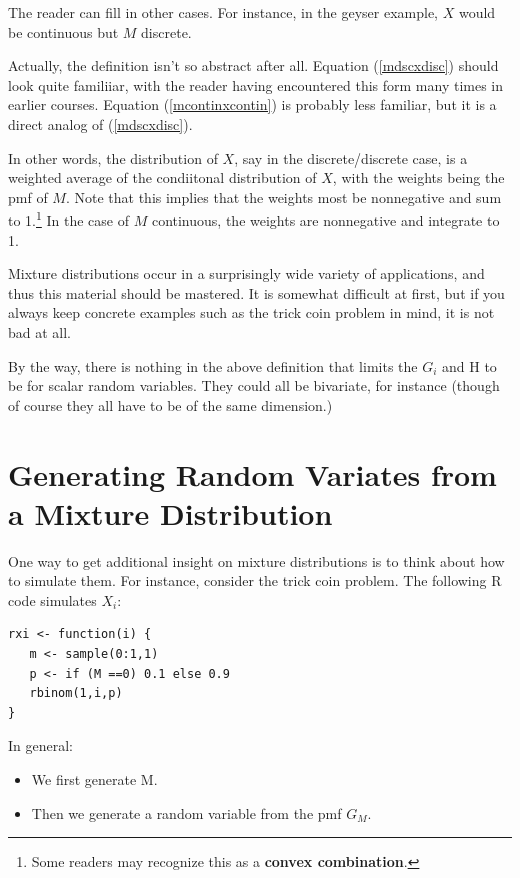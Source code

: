 The reader can fill in other cases.  For instance, in the geyser
example, $X$ would be continuous but $M$ discrete.

Actually, the definition isn't so abstract after all.  Equation
(\ref{mdscxdisc}) should look quite familiiar, with the reader having
encountered this form many times in earlier courses.  Equation
(\ref{mcontinxcontin}) is probably less familiar, but it is a direct
analog of (\ref{mdscxdisc}).

In other words, the distribution of $X$, say in the discrete/discrete case,
is a weighted average of the condiitonal distribution of $X$, with the
weights being the pmf of $M$.  Note that this implies that the weights
most be nonnegative and sum to 1.\footnote{Some readers may recognize
this as a {\bf convex combination}.}  In the case of $M$ continuous, the
weights are nonnegative and integrate to 1.

Mixture distributions occur in a surprisingly wide variety of
applications, and thus this material should be mastered.  It is somewhat
difficult at first, but if you always keep concrete examples such as the
trick coin problem in mind, it is not bad at all.

By the way, there is nothing in the above definition that limits the
$G_i$ and H to be for scalar random variables.  They could all be
bivariate, for instance (though of course they all have to be of the
same dimension.)

\section{Generating Random Variates from a Mixture Distribution}

One way to get additional insight on mixture distributions is to think
about how to simulate them.  For instance, consider the trick coin problem.
The following R code simulates $X_i$:

\begin{lstlisting}
rxi <- function(i) {
   m <- sample(0:1,1)
   p <- if (M ==0) 0.1 else 0.9
   rbinom(1,i,p)
}
\end{lstlisting}

In general:

\begin{itemize}

\item We first generate M.

\item Then we generate a random variable from the pmf $G_M$.

\end{itemize}

